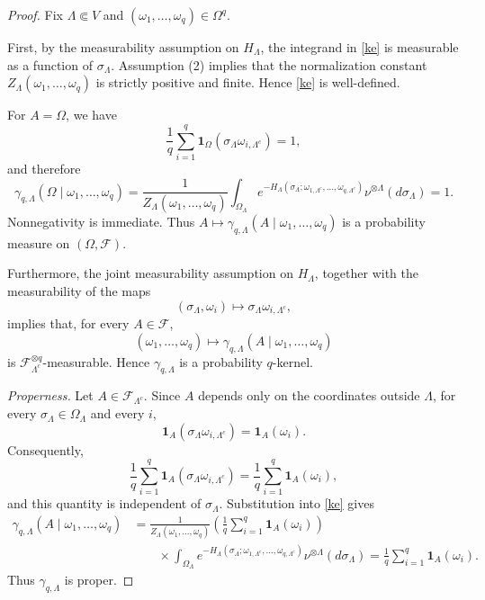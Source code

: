 \documentclass[11pt,reqno]{amsart}
\numberwithin{equation}{section} \setcounter{tocdepth}{1}
\begin{document}
\begin{proof}
	Fix $\Lambda\Subset V$ and
	$(\omega_1,\ldots,\omega_q)\in\Omega^q$.
	
	First, by the measurability assumption on $H_\Lambda$, the integrand
	in \eqref{ke} is measurable as a function of $\sigma_\Lambda$.
	Assumption (2) implies that the normalization constant
	$Z_\Lambda(\omega_1,\ldots,\omega_q)$ is strictly positive and finite.
	Hence \eqref{ke} is well-defined.
	
	For $A=\Omega$, we have
	\[
	\frac{1}{q}\sum_{i=1}^q
	\mathbf{1}_\Omega(\sigma_\Lambda\omega_{i,\Lambda^c})
	=1,
	\]
	and therefore
	\[
			\gamma_{q,\Lambda}(\Omega\mid\omega_1,\ldots,\omega_q)=
		\frac{1}{Z_\Lambda(\omega_1,\ldots,\omega_q)}
		\int_{\Omega_\Lambda}
		e^{-H_\Lambda(
			\sigma_\Lambda;
			\omega_{1,\Lambda^c},\ldots,\omega_{q,\Lambda^c})}
		\nu^{\otimes\Lambda}(d\sigma_\Lambda)=1.
		\]
	Nonnegativity is immediate. Thus
	$A\mapsto\gamma_{q,\Lambda}(A\mid\omega_1,\ldots,\omega_q)$
	is a probability measure on $(\Omega,\mathcal F)$.
	
	Furthermore, the joint measurability assumption on $H_\Lambda$,
	together with the measurability of the maps
	\[
	(\sigma_\Lambda,\omega_i)
	\longmapsto
	\sigma_\Lambda\omega_{i,\Lambda^c},
	\]
	implies that, for every $A\in\mathcal F$,
	\[
	(\omega_1,\ldots,\omega_q)
	\longmapsto
	\gamma_{q,\Lambda}(A\mid\omega_1,\ldots,\omega_q)
	\]
	is $\mathcal F_{\Lambda^c}^{\otimes q}$-measurable. Hence
	$\gamma_{q,\Lambda}$ is a probability $q$-kernel.
	
	\medskip
	
	\noindent
	\textit{Properness.}
	Let $A\in\mathcal F_{\Lambda^c}$. Since $A$ depends only on the
	coordinates outside $\Lambda$, for every
	$\sigma_\Lambda\in\Omega_\Lambda$ and every $i$,
	\[
	\mathbf{1}_A(\sigma_\Lambda\omega_{i,\Lambda^c})
	=
	\mathbf{1}_A(\omega_i).
	\]
	Consequently,
	\[
	\frac{1}{q}\sum_{i=1}^q
	\mathbf{1}_A(\sigma_\Lambda\omega_{i,\Lambda^c})
	=
	\frac{1}{q}\sum_{i=1}^q
	\mathbf{1}_A(\omega_i),
	\]
	and this quantity is independent of $\sigma_\Lambda$. Substitution
	into \eqref{ke} gives
	\[
	\begin{aligned}
		\gamma_{q,\Lambda}(A\mid\omega_1,\ldots,\omega_q)
		&=
		\frac{1}{Z_\Lambda(\omega_1,\ldots,\omega_q)}
		\left(
		\frac{1}{q}\sum_{i=1}^q
		\mathbf{1}_A(\omega_i)
		\right)
		\\
		&\qquad\times
		\int_{\Omega_\Lambda}
		e^{-H_\Lambda(
			\sigma_\Lambda;
			\omega_{1,\Lambda^c},\ldots,\omega_{q,\Lambda^c})}
		\nu^{\otimes\Lambda}(d\sigma_\Lambda)
		=
		\frac{1}{q}\sum_{i=1}^q
		\mathbf{1}_A(\omega_i).
	\end{aligned}
	\]
	Thus $\gamma_{q,\Lambda}$ is proper.
	

\end{proof}
\end{document}
